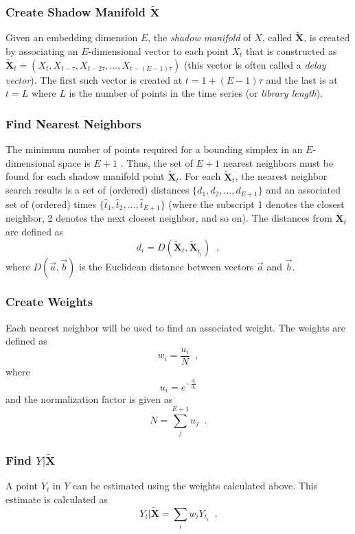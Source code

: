 \documentclass[twocolumn,aps,pre,groupedaddress]{revtex4-1}
\begin{document}
\subsubsection{Create Shadow Manifold $\tilde{\mathbf{X}}$}
\label{sec:shadow}
Given an embedding dimension $E$, the {\em shadow manifold} of $X$, called $\tilde{\mathbf{X}}$, is created by associating an $E$-dimensional vector to each point $X_t$ that is constructed as $\tilde{\mathbf{X}}_t=\left(X_t,X_{t-\tau},X_{t-2\tau},\ldots,X_{t-(E-1)\tau}\right)$ (this vector is often called a {\em delay vector}).  The first such vector is created at $t=1+(E-1)\tau$ and the last is at $t=L$ where $L$ is the number of points in the time series (or {\em library length}).  

\subsubsection{Find Nearest Neighbors}
The minimum number of points required for a bounding simplex in an $E$-dimensional space is $E+1$ \cite{Sugihara1990,Sugihara1990a}.  Thus,  the set of $E+1$ nearest neighbors must be found for each shadow manifold point $\tilde{\mathbf{X}}_t$.  For each $\tilde{\mathbf{X}}_t$, the nearest neighbor search results is a set of (ordered) distances $\{d_1,d_2,\ldots,d_{E+1}\}$ and an associated set of (ordered) times $\{\hat{t}_1,\hat{t}_2,\ldots,\hat{t}_{E+1}\}$ (where the subscript 1 denotes the closest neighbor, 2 denotes the next closest neighbor, and so on).  The distances from $\tilde{\mathbf{X}}_t$ are defined as
$$
d_i = D\left(\tilde{\mathbf{X}}_t,\tilde{\mathbf{X}}_{\hat{t}_i}\right)\;\;,
$$
where $D(\vec{a},\vec{b})$ is the Euclidean distance between vectors $\vec{a}$ and $\vec{b}$.

\subsubsection{Create Weights}
Each nearest neighbor will be used to find an associated weight.  The weights are defined as
$$
w_i = \frac{u_i}{N}\;\;,
$$
where
$$
u_i = e^{-\frac{d_i}{d_1}}
$$
and the normalization factor is given as
$$
N = \sum_{j}^{E+1} u_j\;\;.
$$

\subsubsection{Find $Y|\tilde{\mathbf{X}}$}
A point $Y_t$ in $Y$ can be estimated using the weights calculated above.  This estimate is calculated as
$$
Y_t|\tilde{\mathbf{X}} = \sum_i w_i Y_{t_i}\;\;.
$$
\end{document}
